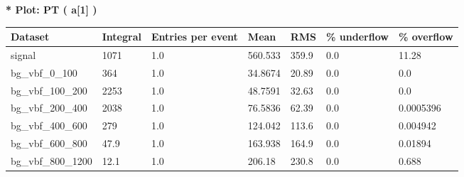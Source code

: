 \documentclass[a4paper, 10pt]{article}
\begin{document}
\textbf{* Plot: PT ( a[1] ) }\\
   \begin{table}[H]
  \begin{center}
    \begin{tabular}{|m{23.0mm}|m{23.0mm}|m{18.0mm}|m{19.0mm}|m{19.0mm}|m{19.0mm}|m{19.0mm}|}
      \hline
      {\cellcolor{yellow}         Dataset}& {\cellcolor{yellow}         Integral}& {\cellcolor{yellow}         Entries per event}& {\cellcolor{yellow}         Mean}& {\cellcolor{yellow}         RMS}& {\cellcolor{yellow}         \% underflow}& {\cellcolor{yellow}         \% overflow}\\
      \hline
      {\cellcolor{white}         signal}& {\cellcolor{white}         1071}& {\cellcolor{white}         1.0}& {\cellcolor{white}         560.533}& {\cellcolor{white}         359.9}& {\cellcolor{orange}         0.0}& {\cellcolor{orange}         11.28}\\
      \hline
      {\cellcolor{white}         bg\_vbf\_0\_100}& {\cellcolor{white}         364}& {\cellcolor{white}         1.0}& {\cellcolor{white}         34.8674}& {\cellcolor{white}         20.89}& {\cellcolor{green}         0.0}& {\cellcolor{green}         0.0}\\
      \hline
      {\cellcolor{white}         bg\_vbf\_100\_200}& {\cellcolor{white}         2253}& {\cellcolor{white}         1.0}& {\cellcolor{white}         48.7591}& {\cellcolor{white}         32.63}& {\cellcolor{green}         0.0}& {\cellcolor{green}         0.0}\\
      \hline
      {\cellcolor{white}         bg\_vbf\_200\_400}& {\cellcolor{white}         2038}& {\cellcolor{white}         1.0}& {\cellcolor{white}         76.5836}& {\cellcolor{white}         62.39}& {\cellcolor{green}         0.0}& {\cellcolor{green}         0.0005396}\\
      \hline
      {\cellcolor{white}         bg\_vbf\_400\_600}& {\cellcolor{white}         279}& {\cellcolor{white}         1.0}& {\cellcolor{white}         124.042}& {\cellcolor{white}         113.6}& {\cellcolor{green}         0.0}& {\cellcolor{green}         0.004942}\\
      \hline
      {\cellcolor{white}         bg\_vbf\_600\_800}& {\cellcolor{white}         47.9}& {\cellcolor{white}         1.0}& {\cellcolor{white}         163.938}& {\cellcolor{white}         164.9}& {\cellcolor{green}         0.0}& {\cellcolor{green}         0.01894}\\
      \hline
      {\cellcolor{white}         bg\_vbf\_800\_1200}& {\cellcolor{white}         12.1}& {\cellcolor{white}         1.0}& {\cellcolor{white}         206.18}& {\cellcolor{white}         230.8}& {\cellcolor{green}         0.0}& {\cellcolor{green}         0.688}\\

\end{tabular}
\end{center}
\end{table}
\end{document}

